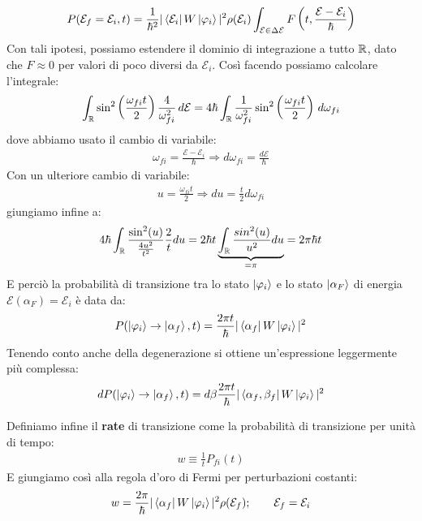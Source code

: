 \documentclass[../../InformazioneQuantistica.tex]{subfiles}
\begin{document}
\begin{enumerate}
    \begin{align*}
        P(\mathcal{E}_f = \mathcal{E}_i, t) = \frac{1}{\hbar^2} |\Bra{\mathcal{E}_i}W\Ket{\varphi_i}|^2 \rho(\mathcal{E}_i) \int_{\mathcal{E}\in \Delta\mathcal{E}} F\left( t, \frac{\mathcal{E}-\mathcal{E}_i}{\hbar}\right)
    \end{align*}
    Con tali ipotesi, possiamo estendere il dominio di integrazione a tutto $\mathbb{R}$, dato che $F \approx 0$ per valori di poco diversi da $\mathcal{E}_i$. Così facendo possiamo calcolare l'integrale:
    \begin{align*}
        \int_{\mathbb{R}} \sin^2 \left( \frac{\omega_{fi}t}{2}\right) \frac{4}{\omega_{fi}^2}\,d\mathcal{E} = 4\hbar \int_{\mathbb{R}} \frac{1}{\omega^2_{fi}} \sin^2\left( \frac{\omega_{fi}t}{2}\right)\, d\omega_{fi}
    \end{align*}
    dove abbiamo usato il cambio di variabile:
    \begin{align*}
        \omega_{fi} = \frac{\mathcal{E}-\mathcal{E}_i}{\hbar} \Rightarrow d\omega_{fi} = \frac{d\mathcal{E}}{\hbar}
    \end{align*}
    Con un ulteriore cambio di variabile:
    \begin{align*}
        u = \frac{\omega_{fi}t}{2} \Rightarrow du = \frac{t}{2} d\omega_{fi}
    \end{align*}
    giungiamo infine a:
    \begin{align*}
        4\hbar \int_{\mathbb{R}} \frac{\sin^2(u)}{\frac{4u^2}{t^2}} \frac{2}{t} du = 2\hbar t \underbrace{\int_{\mathbb{R}} \frac{sin^2(u)}{u^2} du}_{=\pi} = 2\pi \hbar t
    \end{align*}
    E perciò la probabilità di transizione tra lo stato $\Ket{\varphi_i}$ e lo stato $\Ket{\alpha_F}$ di energia $\mathcal{E}(\alpha_F) = \mathcal{E}_i$ è data da:
    \begin{align*}
        P(\Ket{\varphi_i} \to \Ket{\alpha_f}, t) = \frac{2\pi t}{\hbar} |\Bra{\alpha_f} W \Ket{\varphi_i}|^2
    \end{align*}
    Tenendo conto anche della degenerazione si ottiene un'espressione leggermente più complessa:
    \begin{align*}
        dP(\Ket{\varphi_i} \to \Ket{\alpha_f},t) = d\beta \frac{2\pi t}{\hbar} |\Bra{\alpha_f, \beta_f} W\Ket{\varphi_i}|^2
    \end{align*}
    
    Definiamo infine il \textbf{rate} di transizione come la probabilità di transizione per unità di tempo:
    \begin{align*}
        w \equiv \frac{1}{t} P_{fi}(t)
    \end{align*}
    E giungiamo così alla regola d'oro di Fermi per perturbazioni costanti:
    \begin{align*}
        w = \frac{2\pi}{\hbar} |\Bra{\alpha_f}W\Ket{\varphi_i}|^2 \rho(\mathcal{E}_f); \qquad \mathcal{E}_f = \mathcal{E}_i
    \end{align*}
    

\end{enumerate}
\end{document}
